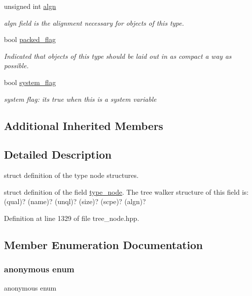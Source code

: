 \begin{DoxyCompactItemize}
unsigned int \hyperlink{structtype__node_a77e914d5fc90882ff838ebe47dbbe5d4}{algn}
\begin{DoxyCompactList}\small\item\em algn field is the alignment necessary for objects of this type. \end{DoxyCompactList}\item 
bool \hyperlink{structtype__node_a8af57f9907db6a9d1f8e8a4b90823adf}{packed\+\_\+flag}
\begin{DoxyCompactList}\small\item\em Indicated that objects of this type should be laid out in as compact a way as possible. \end{DoxyCompactList}\item 
bool \hyperlink{structtype__node_ad4abd137200c754b98ab844cbb17bfc8}{system\+\_\+flag}
\begin{DoxyCompactList}\small\item\em system flag\+: it\textquotesingle{}s true when this is a system variable \end{DoxyCompactList}\end{DoxyCompactItemize}
\subsection*{Additional Inherited Members}


\subsection{Detailed Description}
struct definition of the type node structures. 

struct definition of the field \hyperlink{structtype__node}{type\+\_\+node}. The tree walker structure of this field is\+: (qual)? (name)? (unql)? (size)? (scpe)? (algn)? 

Definition at line 1329 of file tree\+\_\+node.\+hpp.



\subsection{Member Enumeration Documentation}
\mbox{\label{structtype__node_a19bb5bee3a0fa16d1401977070f0995f}} 
\subsubsection{\texorpdfstring{anonymous enum}{anonymous enum}}
{\footnotesize\ttfamily anonymous enum}



